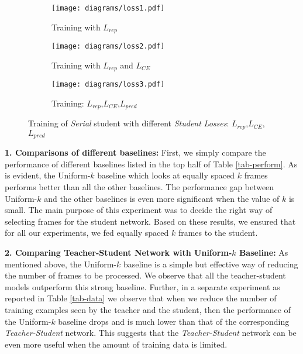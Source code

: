 \documentclass[10pt,twocolumn,letterpaper]{article}
\begin{document}
\begin{figure*}[b]
    \begin{subfigure}[b]{0.33\textwidth}
        \texttt{[image: diagrams/loss1.pdf]}
        \caption{Training with $L_{rep}$}
        \label{loss1}
    \end{subfigure} \begin{subfigure}[b]{0.33\textwidth}
      \texttt{[image: diagrams/loss2.pdf]}
      \caption{Training with $L_{rep}$ and $L_{CE}$}
      \label{loss2}
    \end{subfigure}\begin{subfigure}[b]{0.33\textwidth} 
      \texttt{[image: diagrams/loss3.pdf]}
      \caption{Training: $L_{rep}$,$L_{CE}$,$L_{pred}$}
      \label{loss3}
    \end{subfigure}    
    \caption{Training of \textit{Serial} student with different \textit{Student} \textit{Losses}: $L_{rep}$,$L_{CE}$,$L_{pred}$}\label{losses}
\end{figure*}
\fi 
\noindent\textbf{1. Comparisons of different baselines:} First, we simply compare the performance of different baselines listed in the top half of Table \ref{tab-perform}. As is evident, the Uniform-$k$ baseline which looks at equally spaced $k$ frames performs better than all the other baselines. The performance gap between Uniform-$k$ and the other baselines is even more significant when the value of $k$ is small. The main purpose of this experiment was to decide the right way of selecting frames for the student network. Based on these results, we ensured that for all our experiments, we fed equally spaced $k$ frames to the student. 

\noindent\textbf{2. Comparing Teacher-Student Network with Uniform-$k$ Baseline:} As mentioned above, the Uniform-$k$ baseline is a simple but effective way of reducing the number of frames to be processed. We observe that all the teacher-student models outperform this strong baseline. Further, in a separate experiment as reported in Table \ref{tab-data} we observe that when we reduce the number of training examples seen by the teacher and the student, then the performance of the Uniform-$k$ baseline drops and is much lower than that of the corresponding \textit{Teacher-Student} network. This suggests that the \textit{Teacher-Student} network can be even more useful when the amount of training data is limited. 
\end{document}
